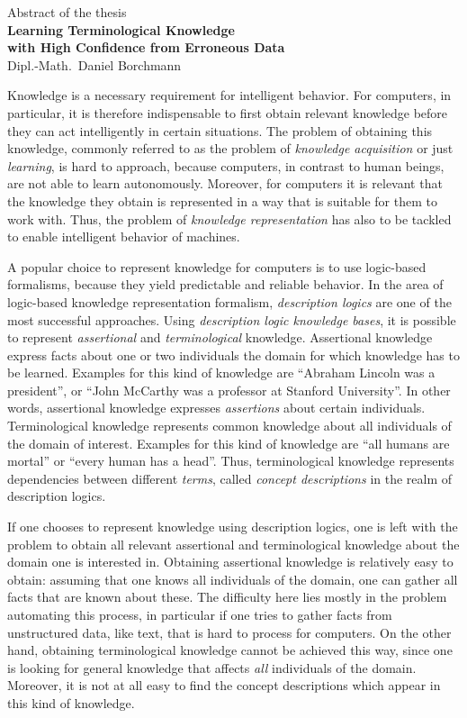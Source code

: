 \documentclass[english]{scrartcl}
\begin{document}
\medskip
\begin{center}
  \normalsize Abstract of the thesis\\
  \LARGE\textbf{Learning Terminological Knowledge\\ with High Confidence from Erroneous
    Data}\\
  \bigskip%
  \large Dipl.-Math.\ Daniel Borchmann
\end{center}
\bigskip
\bigskip

\noindent
Knowledge is a necessary requirement for intelligent behavior.  For computers, in
particular, it is therefore indispensable to first obtain relevant knowledge before they
can act intelligently in certain situations.  The problem of obtaining this knowledge,
commonly referred to as the problem of \emph{knowledge acquisition} or just
\emph{learning}, is hard to approach, because computers, in contrast to human beings, are
not able to learn autonomously.  Moreover, for computers it is relevant that the knowledge
they obtain is represented in a way that is suitable for them to work with.  Thus, the
problem of \emph{knowledge representation} has also to be tackled to enable intelligent
behavior of machines.

A popular choice to represent knowledge for computers is to use logic-based formalisms,
because they yield predictable and reliable behavior.  In the area of logic-based
knowledge representation formalism, \emph{description logics} are one of the most
successful approaches.  Using \emph{description logic knowledge bases}, it is possible to
represent \emph{assertional} and \emph{terminological} knowledge.  Assertional knowledge
express facts about one or two individuals the domain for which knowledge has to be
learned.  Examples for this kind of knowledge are \enquote{Abraham Lincoln was a
  president}, or \enquote{John McCarthy was a professor at Stanford University}.  In other
words, assertional knowledge expresses \emph{assertions} about certain individuals.
Terminological knowledge represents common knowledge about all individuals of the domain
of interest.  Examples for this kind of knowledge are \enquote{all humans are mortal} or
\enquote{every human has a head}.  Thus, terminological knowledge represents dependencies
between different \emph{terms}, called \emph{concept descriptions} in the realm of
description logics.

If one chooses to represent knowledge using description logics, one is left with the
problem to obtain all relevant assertional and terminological knowledge about the domain
one is interested in.  Obtaining assertional knowledge is relatively easy to obtain:
assuming that one knows all individuals of the domain, one can gather all facts that are
known about these.  The difficulty here lies mostly in the problem automating this
process, in particular if one tries to gather facts from unstructured data, like text,
that is hard to process for computers.  On the other hand, obtaining terminological
knowledge cannot be achieved this way, since one is looking for general knowledge that
affects \emph{all} individuals of the domain.  Moreover, it is not at all easy to find the
concept descriptions which appear in this kind of knowledge.



\printbibliography{}
\end{document}
